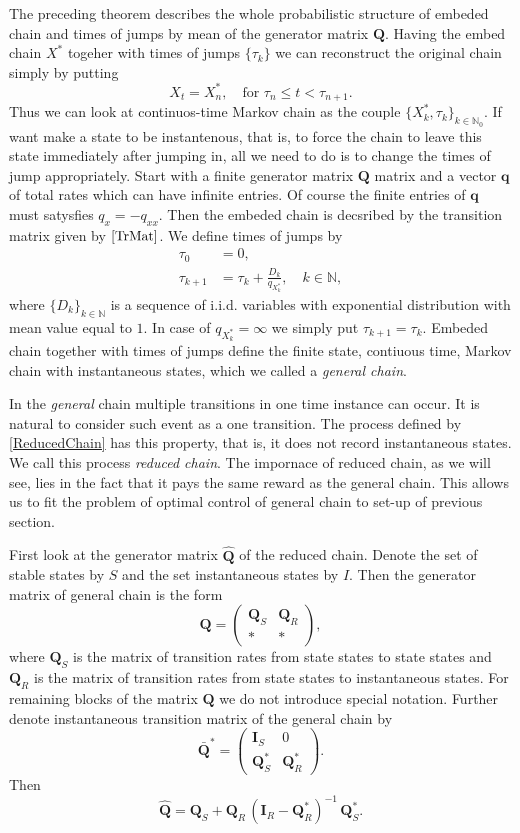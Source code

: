 The preceding theorem describes the whole probabilistic structure of embeded chain and times of jumps by mean of the generator matrix $\bm{Q}$.   
Having the embed chain $X^*$ togeher with times of jumps $\{\tau_k\}$ we can reconstruct the original chain simply by putting
\begin{equation} 
\label{ReducedChain}
 X_t=X^*_n, \quad \text{for } \tau_n\leq t< \tau_{n+1}.
\end{equation}
Thus we can look at continuos-time Markov chain as the couple $\{X^*_k,\tau_k\}_{k\in\mathbb{N}_0}$. If want make a state to be instantenous, that is, to force the chain to leave this state immediately after jumping in, all we need to do is to change the times of jump appropriately. Start with a finite generator matrix $\bm{Q}$ matrix and a vector $\bm{q}$ of total rates which can have infinite entries. Of course the finite entries of $\bm{q}$ must satysfies $q_x=-q_{xx}$. Then the embeded chain is decsribed by the transition matrix given by $\eqref{TrMat}$. We define times of jumps by 
\begin{align*}
\tau_0&=0,\\
\tau_{k+1}&=\tau_k + \frac{D_k}{q_{X^*_k}}, \quad k\in\mathbb{N},
\end{align*}  
where $\{D_k\}_{k\in\mathbb{N}}$ is a sequence of i.i.d. variables with exponential distribution with mean value equal to $1$. In case of $q_{X^*_k}=\infty$ we simply put $\tau_{k+1}=\tau_k$. Embeded chain together with times of jumps define the finite state, contiuous time, Markov chain with instantaneous states, which we called a {\em general chain}. 

In the {\em general} chain multiple transitions in one time instance can occur. It is natural to consider such event as a one transition. The process defined by \eqref{ReducedChain} has this property, that is, it does not record instantaneous states. We call this process {\em reduced chain}. The impornace of reduced chain, as we will see, lies in the fact that it pays the same reward as the general chain. This allows us to fit the problem of optimal control of general chain to set-up of previous section.

First look at the generator matrix $\widehat{\bm{Q}}$ of the reduced chain. Denote the set of stable states by $S$ and the set instantaneous states by $I$. Then the generator matrix of general chain is the form
\[\bm{Q}=
\left( \begin{array}{cc}
\bm{Q}_S & \bm{Q}_R  \\
* & * 
\end{array} \right),
\] 
where $\bm{Q}_S$ is the matrix of transition rates from state states to state states and $\bm{Q}_R$ is the matrix of transition rates from state states to instantaneous states. For remaining blocks of the matrix $\bm{Q}$ we do not introduce special notation. Further denote instantaneous transition matrix of the general chain by
\[\bar{\bm{Q}}^*=
\left( \begin{array}{cc}
\bm{I}_S & 0  \\
\bm{Q}^*_S & \bm{Q}^*_R 
\end{array} \right).
\] 
Then 
\[ \widehat{\bm{Q}}=\bm{Q}_S+\bm{Q}_R \,(\bm{I}_R-\bm{Q}_R^*)^{-1}\,\bm{Q}_S^*. \]

